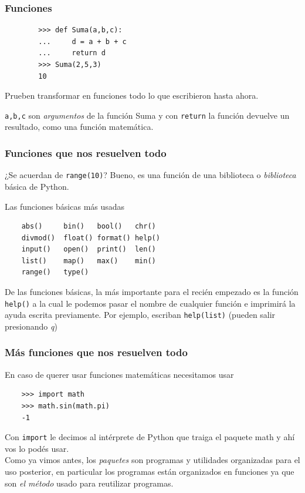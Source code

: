 \documentclass{beamer}
\begin{document}
\begin{frame}[fragile]
\frametitle{Funciones}
    \begin{verbatim}
        >>> def Suma(a,b,c):
        ...     d = a + b + c
        ...     return d
        >>> Suma(2,5,3)
        10
    \end{verbatim}
    Prueben transformar en funciones todo lo que escribieron hasta ahora.
    
    \texttt{a,b,c} son \emph{argumentos} de la función Suma y con \texttt{return} la función devuelve un resultado, como una función matemática.
\end{frame}


\begin{frame}[fragile]
    \frametitle{Funciones que nos resuelven todo}
    ¿Se acuerdan de \texttt{range(10)}? Bueno, es una función de una biblioteca o \emph{biblioteca} básica de Python.
    
    Las funciones básicas más usadas
    {\small
    \begin{center}
    \begin{verbatim}
    abs()     bin()   bool()   chr()   
    divmod()  float() format() help()  
    input()   open()  print()  len()
    list()    map()   max()    min()   
    range()   type()     
    \end{verbatim}
    \end{center}
    }
    De las funciones básicas, la más importante para el recién empezado es la función \texttt{help()} a la cual le podemos pasar el nombre de cualquier función e imprimirá la ayuda escrita previamente. Por ejemplo, escriban \texttt{help(list)} (pueden salir presionando \emph{q})

\end{frame}

\begin{frame}[fragile]
    \frametitle{Más funciones que nos resuelven todo}
    En caso de querer usar funciones matemáticas necesitamos usar
    \begin{verbatim}
    >>> import math
    >>> math.sin(math.pi)
    -1
    \end{verbatim}
    Con \texttt{import} le decimos al intérprete de Python que traiga el paquete math y ahí vos lo podés usar.\\ Como ya vimos antes, los \emph{paquetes} son programas y utilidades organizadas para el uso posterior, en particular los programas están organizados en funciones ya que son \emph{el método} usado para reutilizar programas.
\end{frame}
\end{document}
